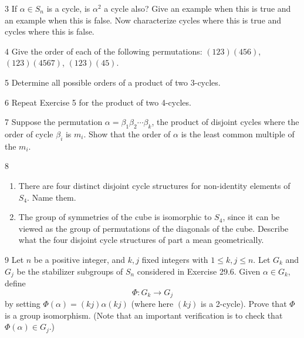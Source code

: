 \begin{problem}{3}
    If $\alpha \in S_n$ is a cycle, is $\alpha^2$ a cycle also? Give an example when this
    is true and an example when this is false. Now characterize cycles where this is true
    and cycles where this is false.
\end{problem}
\unsolved

\begin{problem}{4}
    Give the order of each of the following permutations: $(123)(456)$, $(123)(4567)$,
    $(123)(45)$.
\end{problem}
\unsolved

\begin{problem}{5}
    Determine all possible orders of a product of two 3-cycles.
\end{problem}
\unsolved

\begin{problem}{6}
    Repeat Exercise 5 for the product of two 4-cycles.
\end{problem}
\unsolved

\begin{problem}{7}
    Suppose the permutation $\alpha = \beta_1\beta_2\cdots\beta_k$, the product of
    disjoint cycles where the order of cycle $\beta_i$ is $m_i$. Show that the order of
    $\alpha$ is the least common multiple of the $m_i$.
\end{problem}
\unsolved

\begin{problem}{8}
    \begin{enumerate}
        \item[(a)] There are four distinct disjoint cycle structures for non-identity
        elements of $S_4$. Name them.
        \item[(b)] The group of symmetries of the cube is isomorphic to $S_4$, since it can
        be viewed as the group of permutations of the diagonals of the cube. Describe what
        the four disjoint cycle structures of part a mean geometrically.
    \end{enumerate}
\end{problem}
\unsolved

\begin{problem}{9}
    Let $n$ be a positive integer, and $k, j$ fixed integers with $1 \le k, j \le n$. Let
    $G_k$ and $G_j$ be the stabilizer subgroups of $S_n$ considered in Exercise 29.6.
    Given $\alpha \in G_k$, define
    \[\Phi : G_k \to G_j\]
    by setting $\Phi(\alpha) = (kj)\alpha(kj)$ (where here $(kj)$ is a 2-cycle). Prove that
    $\Phi$ is a group isomorphism. (Note that an important verification is to check that
    $\Phi(\alpha) \in G_j$.)
\end{problem}
\unsolved

